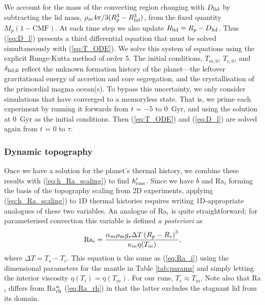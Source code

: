 We account for the mass of the convecting region changing with $D_{\rm lid}$ by subtracting the lid mass, $\rho_m 4\pi/3  (R_p^3 - R_{\rm lid}^3)$, from the fixed quantity $M_p(1 - \text{CMF})$. At each time step we also update $R_{\rm lid} = R_p - D_{\rm lid}$. Thus (\ref{eq:D_l}) presents a third differential equation that must be solved simultaneously with (\ref{eq:T_ODE}). We solve this system of equations using the explicit Runge-Kutta method of order 5. The initial conditions, $T_{m,0}$, $T_{c,0}$, and $\delta_{{\rm lid}, 0}$ reflect the unknown formation history of the planet---the leftover gravitational energy of accretion and core segregation, and the crystallisation of the primordial magma ocean(s). To bypass this uncertainty, we only consider simulations that have converged to a memoryless state. That is, we prime each experiment by running it forwards from $t$ = $-$5 to 0~Gyr, and using the solution at 0~Gyr as the initial conditions. Then (\ref{eq:T_ODE}) and (\ref{eq:D_l}) are solved again from $t$ = 0 to $\tau$.


\subsubsection{Dynamic topography}

Once we have a solution for the planet's thermal history, we combine these results with (\ref{eq:h_Ra_scaling}) to find $h_{\rm  rms}^\prime$. Since we have $b$ and Ra$_i$ forming the basis of the topography scaling from 2D experiments, applying (\ref{eq:h_Ra_scaling}) to 1D thermal histories requires writing 1D-appropriate analogues of these two variables. An analogue of Ra$_i$ is quite straightforward; for parameterised convection this variable is defined \textit{a posteriori} as
\begin{equation}\label{eq:Ra_i_1D}
    {\rm Ra}_i = \frac{\alpha_m\rho_m g_s \Delta T \left(R_p - R_c\right)^3}{\kappa_m \eta(T_m)},
\end{equation}
where $\Delta T = T_s - T_c$. This equation is the same as (\ref{eq:Ra_i}) using the dimensional parameters for the mantle in Table \ref{tab:params} and simply letting the interior viscosity $\eta(T_i) = \eta(T_m)$. For our runs, $T_c \approx T_m$. Note also that Ra$_i$ differs from Ra$_{\rm rh}^u$ (\ref{eq:Ra_rh}) in that the latter excludes the stagnant lid from its domain.

